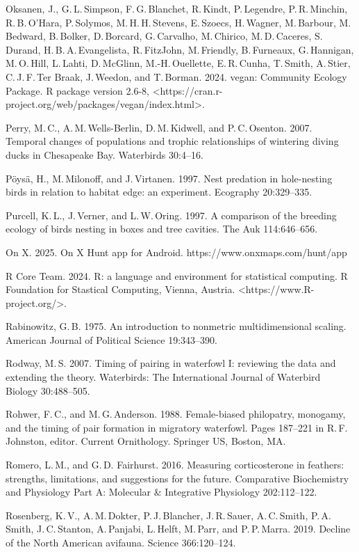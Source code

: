 \begin{hangparas}{2em}{1}
	Oksanen, J., G.\,L.\,Simpson, F.\,G.\,Blanchet, R.\,Kindt, P.\,Legendre, P.\,R.\,Minchin, R.\,B.\,O’Hara, P.\,Solymos, M.\,H.\,H.\,Stevens, E.\,Szoecs, H.\,Wagner, M.\,Barbour, M.\,Bedward, B.\,Bolker, D.\,Borcard, G.\,Carvalho, M.\,Chirico, M.\,D.\,Caceres, S.\,Durand, H.\,B.\,A.\,Evangelista, R.\,FitzJohn, M.\,Friendly, B.\,Furneaux, G.\,Hannigan, M.\,O.\,Hill, L.\,Lahti, D.\,McGlinn, M.-H.\,Ouellette, E.\,R.\,Cunha, T.\,Smith, A.\,Stier, C.\,J.\,F.\,Ter Braak, J.\,Weedon, and T.\,Borman. 2024. vegan: Community Ecology Package. R package version 2.6-8, <https://cran.r-project.org/web/packages/vegan/index.html>. 
	
	Perry, M.\,C., A.\,M.\,Wells-Berlin, D.\,M.\,Kidwell, and P.\,C.\,Osenton. 2007. Temporal changes of populations and trophic relationships of wintering diving ducks in Chesapeake Bay. Waterbirds 30:4–16. 
	
	Pöysä, H., M.\,Milonoff, and J.\,Virtanen. 1997. Nest predation in hole-nesting birds in relation to habitat edge: an experiment. Ecography 20:329–335. 
	
	Purcell, K.\,L., J.\,Verner, and L.\,W.\,Oring. 1997. A comparison of the breeding ecology of birds nesting in boxes and tree cavities. The Auk 114:646–656. 
	
	On X. 2025. On X Hunt app for Android. https://www.onxmaps.com/hunt/app
	
	R Core Team. 2024. R: a language and environment for statistical computing. R Foundation for Stastical Computing, Vienna, Austria.  <https://www.R-project.org/>.
	
	Rabinowitz, G.\,B. 1975. An introduction to nonmetric multidimensional scaling. American Journal of Political Science 19:343–390. 
	
	Rodway, M.\,S. 2007. Timing of pairing in waterfowl I: reviewing the data and extending the theory. Waterbirds: The International Journal of Waterbird Biology 30:488–505. 
	
	Rohwer, F.\,C., and M.\,G.\,Anderson. 1988. Female-biased philopatry, monogamy, and the timing of pair formation in migratory waterfowl. Pages 187–221 in R.\,F.\,Johnston, editor. Current Ornithology. Springer US, Boston, MA. 
	
	Romero, L.\,M., and G.\,D. Fairhurst. 2016. Measuring corticosterone in feathers: strengths, limitations, and suggestions for the future. Comparative Biochemistry and Physiology Part A: Molecular \& Integrative Physiology 202:112–122. 
	
	Rosenberg, K.\,V., A.\,M.\,Dokter, P.\,J.\,Blancher, J.\,R.\,Sauer, A.\,C.\,Smith, P.\,A.\,Smith, J.\,C.\,Stanton, A.\,Panjabi, L.\,Helft, M.\,Parr, and P.\,P.\,Marra. 2019. Decline of the North American avifauna. Science 366:120–124. 
	

\end{hangparas}
